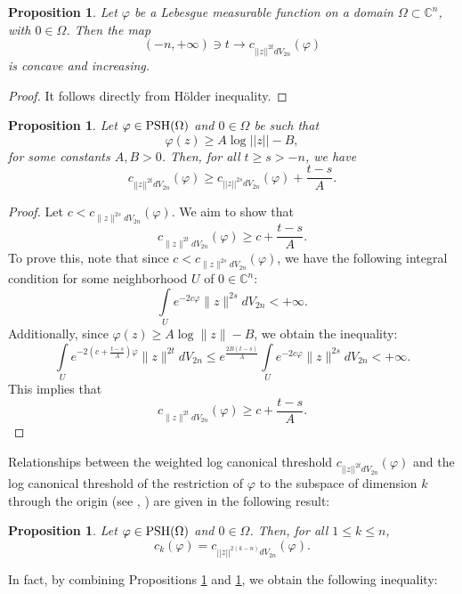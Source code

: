 \documentclass[a4paper,oneside,reqno,11pt]{article}
\newtheorem{proposition}[theorem]{Proposition}
\def\PSH{\mathop{\rm PSH}\nolimits}
\begin{document}
\begin{proposition}\label{concave_property} Let $\varphi$ be a Lebesgue measurable function on a domain $\Omega\subset\mathbb C^n$, with $0\in\Omega$. Then the map
$$(-n, +\infty )\ni t\to c_{ ||z||^{ 2 t } dV_{2n} } (\varphi)$$ 
is concave and increasing.
\end{proposition}

\begin{proof} 
It follows directly from H\"{o}lder inequality.
\end{proof}


 \begin{proposition}\label{weightedlct_inequality} Let $\varphi\in\PSH(\Omega)$ and $0\in\Omega$ be such that 
$$\varphi (z) \geq A \log || z || - B,$$
for some constants $A, B >0$. Then, for all $t\geq s > -n$, we have 
$$c_{ || z ||^{ 2t } dV_{ 2n } } ( \varphi ) \geq c_{ || z ||^{ 2s } dV_{ 2n } } ( \varphi ) + \frac { t - s } { A}.$$ 
\end{proposition}

\begin{proof} 
Let $c < c_{\|z\|^{2s} dV_{2n}} (\varphi) $. We aim to show that
$$c_{\|z\|^{2t} dV_{2n}} (\varphi) \geq c + \frac{t - s}{A}.$$
To prove this, note that since $c < c_{\|z\|^{2s} dV_{2n}} (\varphi)$, we have the following integral condition for some neighborhood $U$ of $0 \in \mathbb{C}^n$:
$$\int\limits_U e^{-2c\varphi} \|z\|^{2s} dV_{2n} < +\infty.$$
Additionally, since $\varphi(z) \geq A \log \|z\| - B$, we obtain the inequality:
$$\int\limits_U e^{-2\left(c + \frac{t - s}{A}\right) \varphi} \|z\|^{2t} dV_{2n} \leq e^{\frac{2B(t - s)}{A}} \int\limits_U e^{-2c\varphi} \|z\|^{2s} dV_{2n} < +\infty.$$
This implies that
$$c_{\|z\|^{2t} dV_{2n}} (\varphi) \geq c + \frac{t - s}{A}.$$
\end{proof}

Relationships between the weighted log canonical threshold $c_{ ||z||^{2 t} dV_{2n} } (\varphi)$ and the log canonical threshold of the restriction of $\varphi$ to the subspace of  dimension $k$ through the origin (see \cite{La13}, \cite{Hi17}) are given in the following result:

\begin{proposition}\label{weighted_property} Let $\varphi\in\PSH(\Omega)$ and $0\in\Omega$. Then, for all $1\leq k\leq n$,
$$c_{k} (\varphi ) = c_{ ||z||^{ 2 ( k - n ) } dV_{2n} } (\varphi).$$ 
\end{proposition}

In fact, by combining Propositions \ref{weightedlct_inequality} and \ref{weighted_property}, we obtain the following inequality:
\end{document}
